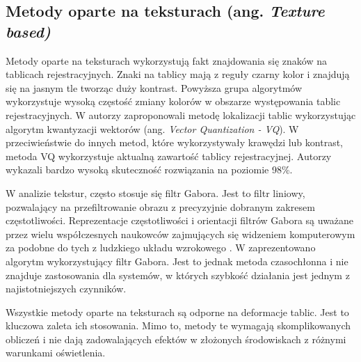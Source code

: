 \subsection{Metody oparte na teksturach (ang. \textit{Texture based)}}
Metody oparte na teksturach wykorzystują fakt znajdowania się znaków na tablicach rejestracyjnych.
Znaki na tablicy mają z reguły czarny kolor i znajdują się na jasnym tle tworząc duży kontrast.
Powyższa grupa algorytmów wykorzystuje wysoką częstość zmiany kolorów w obszarze występowania tablic rejestracyjnych.
W \cite{824138} autorzy zaproponowali metodę lokalizacji tablic wykorzystując algorytm kwantyzacji wektorów (ang. \textit{Vector Quantization - VQ}).
W przeciwieństwie do innych metod, które wykorzystywały krawędzi lub kontrast, metoda VQ wykorzystuje aktualną zawartość tablicy rejestracyjnej.
Autorzy wykazali bardzo wysoką skuteczność rozwiązania na poziomie 98\%.

W analizie tekstur, często stosuje się filtr Gabora.
Jest to filtr liniowy, pozwalający na przefiltrowanie obrazu z precyzyjnie dobranym zakresem częstotliwości.
Reprezentacje częstotliwości i orientacji filtrów Gabora są uważane przez wielu współczesnych naukowców zajmujących się widzeniem komputerowym za podobne do tych z ludzkiego układu wzrokowego \cite{gabor_human_eye}.
W \cite{gabor_lpr} zaprezentowano algorytm wykorzystujący filtr Gabora.
Jest to jednak metoda czasochłonna i nie znajduje zastosowania dla systemów, w których szybkość działania jest jednym z najistotniejszych czynników.

Wszystkie metody oparte na teksturach są odporne na deformacje tablic.
Jest to kluczowa zaleta ich stosowania.
Mimo to, metody te wymagają skomplikowanych obliczeń i nie dają zadowalających efektów w złożonych środowiskach z różnymi warunkami oświetlenia.

